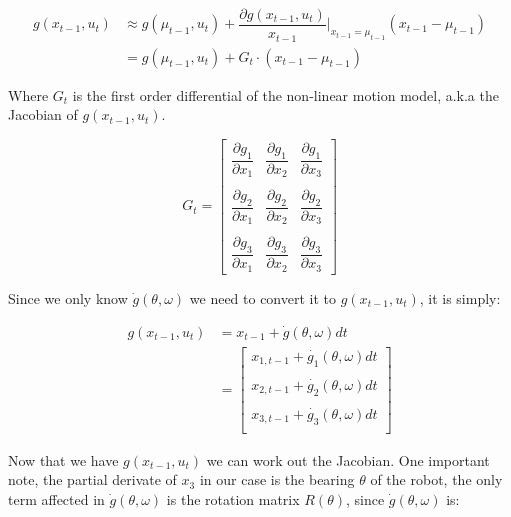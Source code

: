 \documentclass{article}
\begin{document}
\begin{align}
	g(x_{t-1}, u_{t}) 
	& \approx 	
		g(\mu_{t - 1}, u_{t}) 
			+ \dfrac{\partial g(x_{t-1}, u_{t})}{x_{t - 1}} 
				\bigg|_{x_{t - 1} = \mu_{t - 1}}
			(x_{t - 1} - \mu_{t - 1}) \\
	& = g(\mu_{t - 1}, u_{t}) + G_{t} \cdot (x_{t - 1} - \mu_{t - 1})
\end{align}

Where $G_{t}$ is the first order differential of the non-linear motion model, 
a.k.a the Jacobian of $g(x_{t-1}, u_{t})$.

\begin{equation}
	G_{t} = \begin{bmatrix}
		\dfrac{\partial g_{1}}{\partial x_{1}}
		& \dfrac{\partial g_{1}}{\partial x_{2}} 
		& \dfrac{\partial g_{1}}{\partial x_{3}} \\ \\
		\dfrac{\partial g_{2}}{\partial x_{1}}
		& \dfrac{\partial g_{2}}{\partial x_{2}} 
		& \dfrac{\partial g_{2}}{\partial x_{3}} \\ \\
		\dfrac{\partial g_{3}}{\partial x_{1}}
		& \dfrac{\partial g_{3}}{\partial x_{2}} 
		& \dfrac{\partial g_{3}}{\partial x_{3}}
	\end{bmatrix}
\end{equation}

Since we only know $\dot{g}(\theta, \omega)$ we need to convert it to 
$g(x_{t-1}, u_{t})$, it is simply:

\begin{align}
	g(x_{t-1}, u_{t}) 
		&= x_{t - 1} + \dot{g}(\theta, \omega) dt \\
		&= \begin{bmatrix}
			x_{1, t - 1} + \dot{g_{1}}(\theta, \omega) dt \\ \\
			x_{2, t - 1} + \dot{g_{2}}(\theta, \omega) dt \\ \\
			x_{3, t - 1} + \dot{g_{3}}(\theta, \omega) dt \\
		\end{bmatrix}
\end{align}

Now that we have $g(x_{t-1}, u_{t})$ we can work out the Jacobian. One 
important note, the partial derivate of $x_{3}$ in our case is the bearing  
$\theta$ of the robot, the only term affected in $\dot{g}(\theta, \omega)$ is 
the rotation matrix $R(\theta)$, since $\dot{g}(\theta, \omega)$ is:
\end{document}
